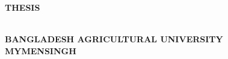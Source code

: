 \documentclass[12pt, oneside]{book}
\begin{document}
\begin{titlepage}
	\begin{center}

\begin{minipage}{\textwidth}
	\centering
	\onehalfspacing 
		\Large \textbf{\MakeUppercase{  
		\ThesisTitle}}
\end{minipage}		
		
\vfill

\begin{minipage}{\textwidth}
	\centering
	\large \bfseries  
	\MyThesis{\ThesisType} THESIS
\end{minipage}
	
\vfill
	

\begin{minipage}{\textwidth}
	\centering
	\onehalfspacing 
		\large \textbf{\MakeUppercase{
		\DeptName\\
		Bangladesh Agricultural University\\
		mymensingh\\ [1.5cm]
		\SubMonth~\SubYear}}
\end{minipage}	
	
\end{center}

\end{titlepage}


\end{document}
